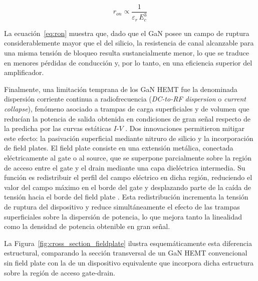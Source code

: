 \begin{equation}
    r_{on} \propto \frac{1}{\varepsilon_r \, E_c^3}
    \label{eq:ron}
\end{equation}

La ecuación~\eqref{eq:ron} muestra que, dado que el GaN posee un campo de ruptura considerablemente mayor que el del silicio, la resistencia de canal alcanzable para una misma tensión de bloqueo resulta sustancialmente menor, lo que se traduce en menores pérdidas de conducción y, por lo tanto, en una eficiencia superior del amplificador.

Finalmente, una limitación temprana de los GaN HEMT fue la denominada dispersión corriente continua a radiofrecuencia (\textit{DC-to-RF dispersion} o \textit{current collapse}), fenómeno asociado a trampas de carga superficiales y de volumen que reducían la potencia de salida obtenida en condiciones de gran señal respecto de la predicha por las curvas estáticas $I$-$V$ \cite{Mishra2008}. Dos innovaciones permitieron mitigar este efecto: la pasivación superficial mediante nitruro de silicio y la incorporación de field plates. El field plate consiste en una extensión metálica, conectada eléctricamente al gate o al source, que se superpone parcialmente sobre la región de acceso entre el gate y el drain mediante una capa dieléctrica intermedia. Su función es redistribuir el perfil del campo eléctrico en dicha región, reduciendo el valor del campo máximo en el borde del gate y desplazando parte de la caída de tensión hacia el borde del field plate \cite{Mishra2008}. Esta redistribución incrementa la tensión de ruptura del dispositivo y reduce simultáneamente el efecto de las trampas superficiales sobre la dispersión de potencia, lo que mejora tanto la linealidad como la densidad de potencia obtenible en gran señal. 

La Figura~\ref{fig:cross_section_fieldplate} ilustra esquemáticamente esta diferencia estructural, comparando la sección transversal de un GaN HEMT convencional sin field plate con la de un dispositivo equivalente que incorpora dicha estructura sobre la región de acceso gate-drain.


